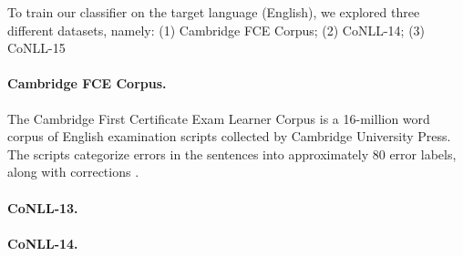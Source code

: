 To train our classifier on the target language (English), we explored three
different datasets, namely: (1) Cambridge FCE Corpus; (2) CoNLL-14; (3) CoNLL-15

\paragraph{Cambridge FCE Corpus.}
The Cambridge First Certificate Exam Learner Corpus is a 16-million word 
corpus of English examination scripts collected by Cambridge University Press. 
The scripts categorize errors in the sentences into approximately 80 error labels, 
along with corrections \cite{NichollsFce}. 

\paragraph{CoNLL-13.}

\paragraph{CoNLL-14.}